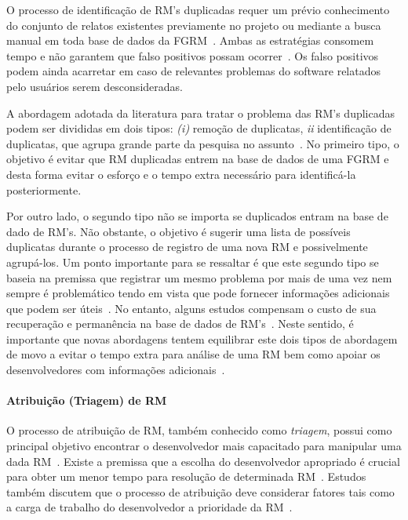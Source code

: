 O processo de identificação de RM's duplicadas requer um prévio conhecimento do
conjunto de relatos existentes previamente no projeto ou mediante a busca manual
em toda base de dados da FGRM~\cite{banerjee2012automated,
	Lerch:2013:FDY:2495256.2495763,hindle2016contextual}. Ambas as estratégias
consomem tempo e não garantem que falso positivos possam
ocorrer~\cite{kaushik2012comparative}. Os falso positivos podem ainda acarretar
em caso de relevantes problemas do software relatados pelo usuários serem
desconsideradas.

A abordagem adotada da literatura para tratar o problema das RM's duplicadas
podem ser divididas em dois tipos\cite{kaushik2012comparative,
	tian2012improved}: \textit{(i)} remoção de duplicatas, \textit{ii}
identificação de duplicatas, que agrupa grande parte da pesquisa no
assunto~\cite{cavalcanti2014challenges}. No primeiro tipo, o objetivo é evitar
que RM duplicadas entrem na base de dados de uma FGRM e desta forma evitar o
esforço e o tempo extra necessário para identificá-la posteriormente.

Por outro lado, o segundo tipo não se importa se duplicados entram na base de
dado de RM's. Não obstante, o objetivo é sugerir uma lista de possíveis
duplicatas durante o processo de registro de uma nova RM e possivelmente
agrupá-los. Um ponto importante para se ressaltar é que este segundo tipo se
baseia na premissa que registrar um mesmo problema por mais de uma vez nem
sempre é problemático tendo em vista que pode fornecer informações adicionais
que podem ser úteis~\cite{bettenburg2008duplicate}. No entanto, alguns estudos
compensam o custo de sua recuperação e permanência na base de dados de
RM's~\cite{davidson2011coping}. Neste sentido, é importante que novas
abordagens tentem equilibrar este dois tipos de abordagem de movo a evitar o
tempo extra para análise de uma RM bem como apoiar os desenvolvedores com
informações adicionais~\cite{Lerch:2013:FDY:2495256.2495763,Thung2014}.

\paragraph{Atribuição (Triagem) de RM}
O processo de atribuição de RM, também conhecido como \textit{triagem}, possui
como principal objetivo encontrar o desenvolvedor mais capacitado para manipular
uma dada RM~\cite{cavalcanti2014challenges}. Existe a premissa que a escolha do
desenvolvedor apropriado é crucial para obter um menor tempo para resolução de
determinada RM~\cite{di2002approach}. Estudos também discutem que o processo de
atribuição deve considerar fatores tais como a carga de trabalho do
desenvolvedor a prioridade da RM~\cite{aljarah2011selecting}.

